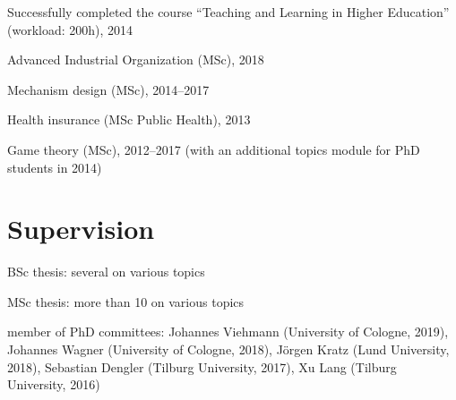\documentclass[a4paper]{article}
\renewenvironment{itemize}{
  \begin{list}{}{
    \setlength{\leftmargin}{1.5em}
  }
}{
  \end{list}
}
\begin{document}
Successfully completed the course ``Teaching and Learning in Higher Education'' (workload: 200h), 2014

\begin{itemize}
  \item Advanced Industrial Organization (MSc), 2018
\item Mechanism design (MSc), 2014--2017
\item Health insurance (MSc Public Health), 2013
\item Game theory (MSc), 2012--2017 (with an additional topics module for PhD students in 2014)
\end{itemize}





\section*{Supervision}

\begin{itemize}
\item BSc thesis: several on various topics
\item MSc thesis: more than 10 on various topics
\item member of PhD committees: Johannes Viehmann (University of Cologne, 2019), Johannes Wagner (University of Cologne, 2018), J\"orgen Kratz (Lund University, 2018), Sebastian Dengler (Tilburg University, 2017), Xu Lang (Tilburg University, 2016)
\end{itemize}
\end{document}
